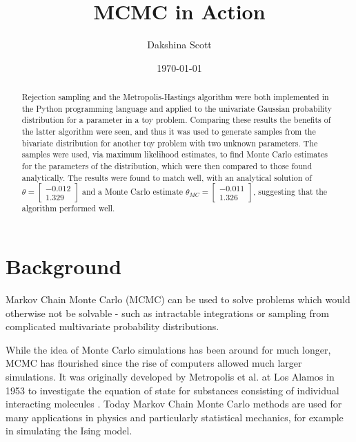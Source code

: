 \documentclass[a4paper,11pt,twoside]{article}
\begin{document}
 
\title{MCMC in Action}

\date{\today} 
\author{Dakshina Scott} 
\maketitle

\begin{abstract} 
Rejection sampling and the Metropolis-Hastings algorithm were both
implemented in the Python programming language and applied to the univariate
Gaussian probability distribution for a parameter in a toy problem. Comparing
these results the benefits of the latter algorithm were seen, and thus it was
used to generate samples from the bivariate distribution for another toy
problem with two unknown parameters.
The samples were used, via maximum likelihood estimates, to find
Monte Carlo estimates for the parameters of the distribution, which were then
compared to those found analytically. The results were found to match well, with an
analytical solution of 
$\theta = \begin{bmatrix} 
		-0.012 \\ 
	1.329 \end{bmatrix}$ and a Monte Carlo estimate $\theta_{MC} = \begin{bmatrix} 
		-0.011 \\ 
	1.326 \end{bmatrix}$, suggesting that the algorithm performed well.  

\end{abstract}

\tableofcontents

\section{Background} 
Markov Chain Monte Carlo (MCMC) can be used to solve problems which would
otherwise not be solvable - such as intractable integrations or sampling from
complicated multivariate probability distributions.  

While the idea of Monte Carlo simulations has been
around for much longer, MCMC has flourished since the rise of computers allowed
much larger simulations. It was originally developed by Metropolis et al. at Los Alamos in
1953 to investigate the equation of state for substances consisting of
individual interacting molecules \cite{metropolis}. Today Markov Chain Monte
Carlo methods are used for many applications in physics and particularly statistical
mechanics, for example in simulating the Ising model\cite{statphys}.
\end{document}
